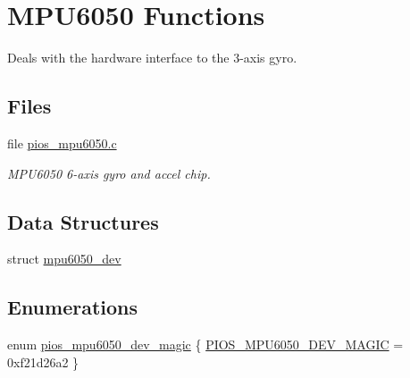 \hypertarget{group___p_i_o_s___m_p_u6050}{\section{M\-P\-U6050 Functions}
\label{group___p_i_o_s___m_p_u6050}
}


Deals with the hardware interface to the 3-\/axis gyro.  


\subsection*{Files}
\begin{DoxyCompactItemize}
\item 
file \hyperlink{pios__mpu6050_8c}{pios\-\_\-mpu6050.\-c}
\begin{DoxyCompactList}\small\item\em M\-P\-U6050 6-\/axis gyro and accel chip. \end{DoxyCompactList}\end{DoxyCompactItemize}
\subsection*{Data Structures}
\begin{DoxyCompactItemize}
\item 
struct \hyperlink{structmpu6050__dev}{mpu6050\-\_\-dev}
\end{DoxyCompactItemize}
\subsection*{Enumerations}
\begin{DoxyCompactItemize}
\item 
enum \hyperlink{group___p_i_o_s___m_p_u6050_ga22a9ad4120542ed164b6afe9b094b6f3}{pios\-\_\-mpu6050\-\_\-dev\-\_\-magic} \{ \hyperlink{group___p_i_o_s___m_p_u6050_gga22a9ad4120542ed164b6afe9b094b6f3ab2ce219069f414a9b51976c869c1c3b6}{P\-I\-O\-S\-\_\-\-M\-P\-U6050\-\_\-\-D\-E\-V\-\_\-\-M\-A\-G\-I\-C} = 0xf21d26a2
 \}
\end{DoxyCompactItemize}
